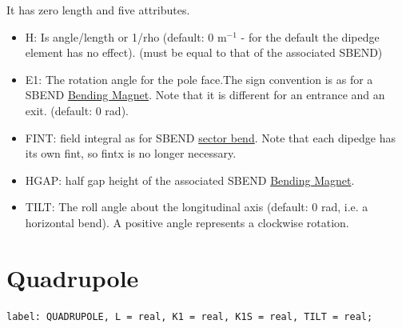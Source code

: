 It has zero length and five attributes. 
\begin{itemize}
   \item H: Is angle/length or 1/rho (default: 0 m$^{-1}$ - for the
     default the dipedge element has no effect). (must be equal to that
     of the associated SBEND)  
   \item E1: The rotation angle for the pole face.The sign convention is
     as for a SBEND \href{bend.html}{Bending Magnet}. Note that it is
     different for an entrance and an exit. (default: 0 rad).  
   \item FINT: field integral as for SBEND
     \href{local_system.html#sbend}{sector bend}. Note that each dipedge
     has its own fint, so fintx is no longer necessary.  
   \item HGAP: half gap height of the associated SBEND
     \href{bend.html}{Bending Magnet}.   
   \item TILT: The roll angle about the longitudinal axis (default: 0
     rad, i.e. a horizontal bend). A positive angle represents a
     clockwise rotation.  
\end{itemize}



%

\section{Quadrupole}
\label{sec:quadrupole}

\begin{verbatim}
label: QUADRUPOLE, L = real, K1 = real, K1S = real, TILT = real;
\end{verbatim}    

